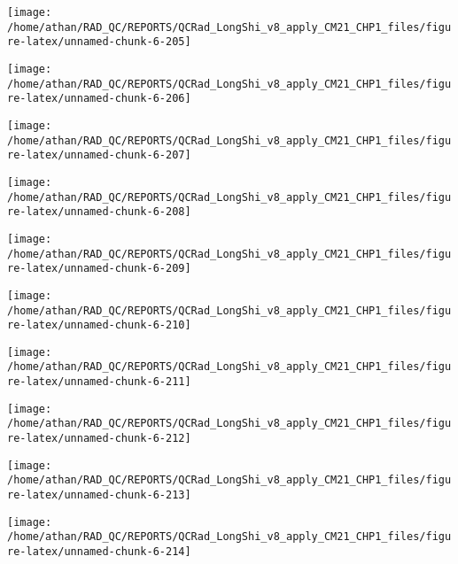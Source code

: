 \documentclass[
  10pt,
  a4paper,oneside]{article}
\begin{document}
\begin{center}\texttt{[image: /home/athan/RAD\_QC/REPORTS/QCRad\_LongShi\_v8\_apply\_CM21\_CHP1\_files/figure-latex/unnamed-chunk-6-205]} \end{center}

\begin{center}\texttt{[image: /home/athan/RAD\_QC/REPORTS/QCRad\_LongShi\_v8\_apply\_CM21\_CHP1\_files/figure-latex/unnamed-chunk-6-206]} \end{center}

\begin{center}\texttt{[image: /home/athan/RAD\_QC/REPORTS/QCRad\_LongShi\_v8\_apply\_CM21\_CHP1\_files/figure-latex/unnamed-chunk-6-207]} \end{center}

\begin{center}\texttt{[image: /home/athan/RAD\_QC/REPORTS/QCRad\_LongShi\_v8\_apply\_CM21\_CHP1\_files/figure-latex/unnamed-chunk-6-208]} \end{center}

\begin{center}\texttt{[image: /home/athan/RAD\_QC/REPORTS/QCRad\_LongShi\_v8\_apply\_CM21\_CHP1\_files/figure-latex/unnamed-chunk-6-209]} \end{center}

\begin{center}\texttt{[image: /home/athan/RAD\_QC/REPORTS/QCRad\_LongShi\_v8\_apply\_CM21\_CHP1\_files/figure-latex/unnamed-chunk-6-210]} \end{center}

\begin{center}\texttt{[image: /home/athan/RAD\_QC/REPORTS/QCRad\_LongShi\_v8\_apply\_CM21\_CHP1\_files/figure-latex/unnamed-chunk-6-211]} \end{center}

\begin{center}\texttt{[image: /home/athan/RAD\_QC/REPORTS/QCRad\_LongShi\_v8\_apply\_CM21\_CHP1\_files/figure-latex/unnamed-chunk-6-212]} \end{center}

\begin{center}\texttt{[image: /home/athan/RAD\_QC/REPORTS/QCRad\_LongShi\_v8\_apply\_CM21\_CHP1\_files/figure-latex/unnamed-chunk-6-213]} \end{center}

\begin{center}\texttt{[image: /home/athan/RAD\_QC/REPORTS/QCRad\_LongShi\_v8\_apply\_CM21\_CHP1\_files/figure-latex/unnamed-chunk-6-214]} \end{center}
\end{document}
